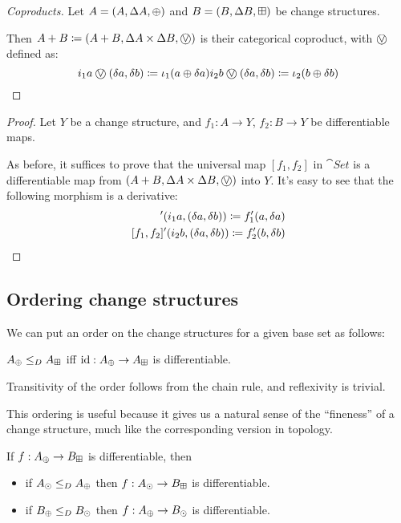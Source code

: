 \begin{proof}[Coproducts]
  Let $A = (A,\Delta A,\oplus)$ and $B =
  (B,\Delta B,\boxplus)$ be change structures.

  Then $A + B \defeq \cstruct{A + B}{\changes{A} \times
  \changes{B}}{\cplusvee}$ is their categorical coproduct, with $\cplusvee$ defined as:
  $$
    i_1 a \cplusvee (\change{a}, \change{b}) \defeq \iota_1 (a \cplus \change{a})\\
    i_2 b \cplusvee (\change{a}, \change{b}) \defeq \iota_2 (b \cplus \change{b})
  $$
\end{proof}
\begin{proof}
  Let $Y$ be a change structure, and $f_1 : A \rightarrow Y$, $f_2 : B
  \rightarrow Y$ be differentiable maps.

  As before, it suffices to prove that the universal map $[f_1, f_2]$ in $\cat{Set}$ is a differentiable
  map from $\cstruct{A + B}{\changes{A} \times \changes{B}}{\cplusvee}$ into $Y$. It's easy to see 
  that the following morphism is a derivative:
  \begin{align*}
    [f_1, f_2]' (i_1 a, (\change{a}, \change{b})) \defeq f_1'(a, \change{a})\\
    [f_1, f_2]' (i_2 b, (\change{a}, \change{b})) \defeq f_2'(b, \change{b})\\
  \end{align*}
\end{proof}

\subsection{Ordering change structures}

We can put an order on the change structures for a given base set as follows:

\begin{defn}
  $A_\oplus \leq_D A_\boxplus$ iff $\textrm{id}: A_\oplus \rightarrow A_\boxplus$ is differentiable.
\end{defn}

Transitivity of the order follows from the chain rule, and reflexivity is trivial.

This ordering is useful because it gives us a natural sense of the ``fineness''
of a change structure, much like the corresponding version in topology.

\begin{prop}
  If $f: A_\oplus \rightarrow B_\boxplus$ is differentiable, then
  \begin{itemize}
    \item if $A_\odot \leq_D A_\oplus$ then $f: A_\odot \rightarrow
      B_\boxplus$ is differentiable.
    \item if $B_\oplus \leq_D B_\odot$ then $f: A_\oplus \rightarrow
      B_\odot$ is differentiable.
  \end{itemize}
\end{prop}

